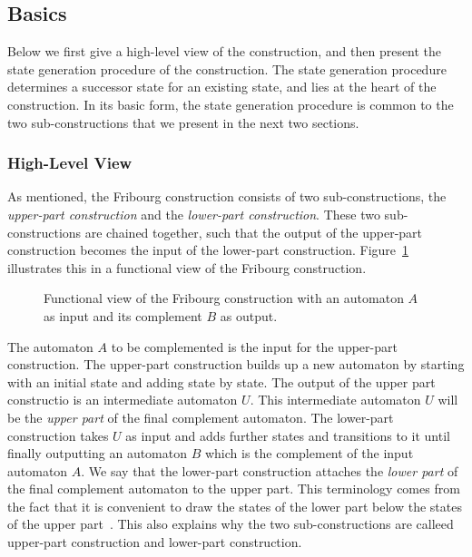 \subsection{Basics}
\label{3_basics}
Below we first give a high-level view of the construction, and then present the state generation procedure of the construction. The state generation procedure determines a successor state for an existing state, and lies at the heart of the construction. In its basic form, the state generation procedure is common to the two sub-constructions that we present in the next two sections.

\subsubsection{High-Level View}
As mentioned, the Fribourg construction consists of two sub-constructions, the \textit{upper-part construction} and the \textit{lower-part construction}. These two sub-constructions are chained together, such that the output of the upper-part construction becomes the input of the lower-part construction. Figure~\ref{fribourg_construction} illustrates this in a functional view of the Fribourg construction.

\begin{figure}[htb]
\centering
\FribourgConstruction
\caption{Functional view of the Fribourg construction with an automaton $A$ as input and its complement $B$ as output.}
\label{fribourg_construction}
\end{figure}

The automaton $A$ to be complemented is the input for the upper-part construction. The upper-part construction builds up a new automaton by starting with an initial state and adding state by state. The output of the upper part constructio is an intermediate automaton $U$. This intermediate automaton $U$ will be the \textit{upper part} of the final complement automaton. The lower-part construction takes $U$ as input and adds further states and transitions to it until finally outputting an automaton $B$ which is the complement of the input automaton $A$. We say that the lower-part construction attaches the \textit{lower part} of the final complement automaton to the upper part. This terminology comes from the fact that it is convenient to draw the states of the lower part below the states of the upper part~\cite{2014_joel_ulrich}. This also explains why the two sub-constructions are calleed upper-part construction and lower-part construction.


